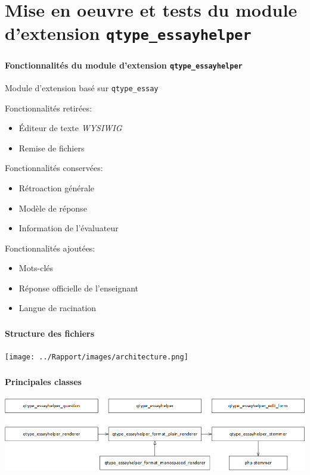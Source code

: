 \documentclass{beamer}
\begin{document}
  \section[Mise en oeuvre]{Mise en oeuvre et tests du module d'extension \texttt{qtype\_essayhelper}}
  \begin{frame}
  \frametitle{\insertsection}
  \framesubtitle{Fonctionnalit\'es du module d'extension \texttt{qtype\_essayhelper}}
  Module d'extension bas\'e sur \texttt{qtype\_essay}
  
  Fonctionnalit\'es retir\'ees:
  \begin{itemize}
    \item \'Editeur de texte \textit{WYSIWIG}
    \item Remise de fichiers
  \end{itemize}
  
  Fonctionnalit\'es conserv\'ees:
  \begin{itemize}
    \item R\'etroaction g\'en\'erale
    \item Mod\`ele de r\'eponse
    \item Information de l'\'evaluateur
  \end{itemize}
  
  Fonctionnalit\'es ajout\'ees:
  \begin{itemize}
    \item Mots-cl\'es
    \item R\'eponse officielle de l'enseignant
    \item Langue de racination
  \end{itemize}
  \end{frame}
  
  \begin{frame}
  \frametitle{\insertsection}
  \framesubtitle{Structure des fichiers}
  \begin{center}
    \texttt{[image: ../Rapport/images/architecture.png]}
  \end{center}
  \end{frame}
  
  \begin{frame}
  \frametitle{\insertsection}
  \framesubtitle{Principales classes}
  \begin{center}
    \includegraphics[scale=0.4]{images/class-simple.png}
  \end{center}
  \end{frame}
\end{document}
